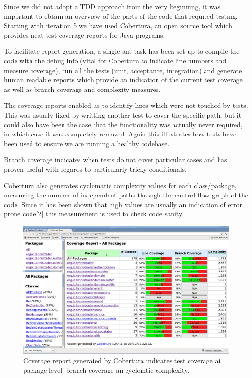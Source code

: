 \documentclass[10pt]{article}
\begin{document}
Since we did not adopt a TDD approach from the very beginning, it was important to obtain an overview of the parts of the code that required testing. Starting with iteration 5 we have used Cobertura,  an open source tool which provides neat test coverage reports for Java programs.

To facilitate report generation, a single ant task has been set up to compile the code with the debug info (vital for Cobertura to indicate line numbers and measure coverage), run all the tests (unit, acceptance, integration) and generate human readable reports which provide an indication of the current test coverage as well as branch coverage and complexity measures.

The coverage reports enabled us to identify lines which were not touched by tests. This was usually fixed by writting another test to cover the specific path, but it could also have been the case that the functionality was actually never required, in which case it was completely removed. Again this illustrates how tests have been used to ensure we are running a healthy codebase.

Branch coverage indicates when tests do not cover particular cases and has proven useful with regards to particularly tricky conditionals.

Cobertura also generates cyclomatic complexity values for each class/package, measuring the number of independent paths through the control flow graph of the code. Since it has been shown that high values are usually an indication of error prone code[2] this measurement is used to check code sanity.

\begin{figure}[ht]
\centering
\includegraphics[bb=0 0 1680 1050, scale = 0.2]{coverage.png}
\caption{Coverage report generated by Cobertura indicates test coverage at package level, branch coverage an cyclomtic complexity.}
\end{figure}
\end{document}
